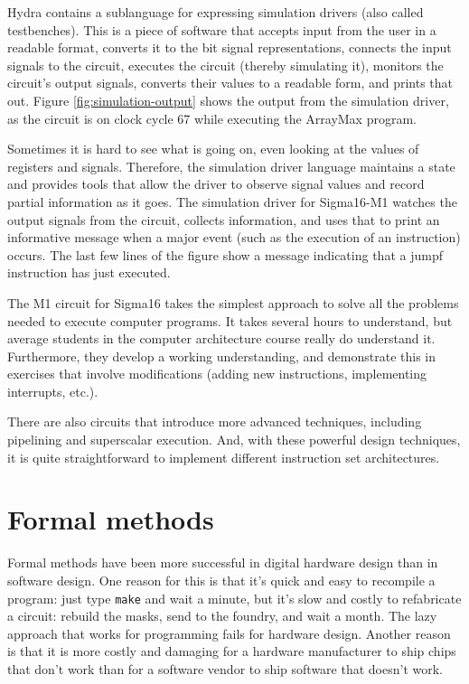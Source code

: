 \documentclass[submission,copyright,creativecommons]{eptcs}
\begin{document}
Hydra contains a sublanguage for expressing simulation drivers
(also called testbenches).  This is a piece of software that
accepts input from the user in a readable format, converts it to
the bit signal representations, connects the input signals to the
circuit, executes the circuit (thereby simulating it), monitors the
circuit's output signals, converts their values to a readable form,
and prints that out.  Figure \ref{fig:simulation-output} shows the
output from the simulation driver, as the circuit is on clock cycle
67 while executing the ArrayMax program.

Sometimes it is hard to see what is going on, even looking at the
values of registers and signals.  Therefore, the simulation driver
language maintains a state and provides tools that allow the driver
to observe signal values and record partial information as it goes.
The simulation driver for Sigma16-M1 watches the output signals
from the circuit, collects information, and uses that to print an
informative message when a major event (such as the execution of an
instruction) occurs.  The last few lines of the figure show a
message indicating that a jumpf instruction has just executed.

The M1 circuit for Sigma16 takes the simplest approach to solve all
the problems needed to execute computer programs.  It takes several
hours to understand, but average students in the computer
architecture course really do understand it.  Furthermore, they
develop a working understanding, and demonstrate this in exercises
that involve modifications (adding new instructions, implementing
interrupts, etc.).

There are also circuits that introduce more advanced techniques,
including pipelining and superscalar execution.  And, with these
powerful design techniques, it is quite straightforward to
implement different instruction set architectures.

\section{Formal methods}
\label{sec:formal}

Formal methods have been more successful in digital hardware design
than in software design.  One reason for this is that it's quick and
easy to recompile a program: just type \texttt{make} and wait a
minute, but it's slow and costly to refabricate a circuit: rebuild the
masks, send to the foundry, and wait a month.  The lazy approach that
works for programming fails for hardware design.  Another reason is
that it is more costly and damaging for a hardware manufacturer to
ship chips that don't work than for a software vendor to ship software
that doesn't work.
\end{document}
